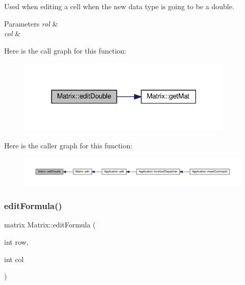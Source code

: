 Used when editing a cell when the new data type is going to be a double. 
\begin{DoxyParams}{Parameters}
{\em rol} & \\
\hline
{\em col} & \\
\hline
\end{DoxyParams}
Here is the call graph for this function\+:\nopagebreak
\begin{figure}[H]
\begin{center}
\leavevmode
\includegraphics[width=292pt]{class_matrix_a147d3813e96ef757fb0d5ff65e5f97ef_cgraph}
\end{center}
\end{figure}
Here is the caller graph for this function\+:\nopagebreak
\begin{figure}[H]
\begin{center}
\leavevmode
\includegraphics[width=350pt]{class_matrix_a147d3813e96ef757fb0d5ff65e5f97ef_icgraph}
\end{center}
\end{figure}
\mbox{\label{class_matrix_af3d26e46fcec1a98380b1af04f008f22}} 
\subsubsection{\texorpdfstring{edit\+Formula()}{editFormula()}}
{\footnotesize\ttfamily matrix Matrix\+::edit\+Formula (\begin{DoxyParamCaption}\item[{int}]{row,  }\item[{int}]{col }\end{DoxyParamCaption})\hspace{0.3cm}{\ttfamily [private]}}

